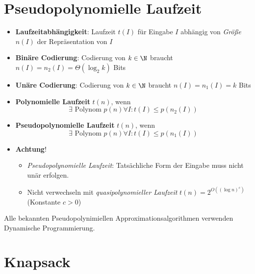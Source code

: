 \section{Pseudopolynomielle Laufzeit}

\begin{itemize}
  \item \textbf{Laufzeitabhängigkeit}: Laufzeit $ t(I) $ für Eingabe $ I $ abhängig von \emph{Größe} $ n(I) $ der Repräsentation von $ I $
  \item \textbf{Binäre Codierung}: Codierung von $ k \in \N $ braucht $ n(I) = n_2(I) = \Theta(\log_2 k) $ Bits
  \item \textbf{Unäre Codierung}: Codierung von $ k \in \N $ braucht $ n(I) = n_1(I) = k $ Bits
  \item \textbf{Polynomielle Laufzeit} $ t(n) $, wenn
    \begin{equation*}
      \exists \text{ Polynom } p(n) \forall I : t(I) \leq p(n_2(I))
    \end{equation*}
  \item \textbf{Pseudopolynomielle Laufzeit} $ t(n) $, wenn
    \begin{equation*}
      \exists \text{ Polynom } p(n) \forall I : t(I) \leq p(n_1(I))
    \end{equation*}
  \item \textbf{Achtung}!
  \begin{itemize}
    \item \emph{Pseudopolynomielle Laufzeit}: Tatsächliche Form der Eingabe muss nicht unär erfolgen.
    \item Nicht verwechseln mit \emph{quasipolynomieller Laufzeit} $ t(n) = 2^{O((\log n)^c)} $ (Konstante $ c > 0 $)
  \end{itemize}
\end{itemize}

Alle bekannten Pseudopolynimiellen Approximationsalgorithmen verwenden Dynamische Programmierung.

\section{Knapsack}

